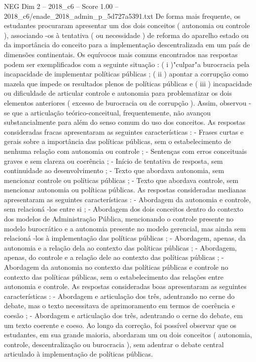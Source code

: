 \begin{textsample}{NEG Dim 2 – 2018\_c6 – Score 1.00 – 2018\_c6/enade\_2018\_admin\_p\_5d727a5391.txt}
De forma mais frequente, os estudantes procuraram apresentar um dos dois conceitos ( autonomia ou controle ), associando -os à tentativa ( ou necessidade ) de reforma do aparelho estado ou da importância do conceito para a implementação descentralizada em um país de dimensões continentais.
Os equívocos mais comuns encontrados nas respostas podem ser exemplificados com a seguinte situação : ( i )"culpar"a burocracia pela incapacidade de implementar políticas públicas ; ( ii ) apontar a corrupção como mazela que impede os resultados plenos de políticas públicas e ( iii ) incapacidade ou dificuldade de articular controle e autonomia para problematizar os dois elementos anteriores ( excesso de burocracia ou de corrupção ).
Assim, observou -se que a articulação teórico-conceitual, frequentemente, não avançou substancialmente para além do senso comum do uso dos conceitos.
As respostas consideradas fracas apresentaram as seguintes características : - Frases curtas e gerais sobre a importância das políticas públicas, sem o estabelecimento de nenhuma relação com autonomia ou controle ; - Sentenças com erros conceituais graves e sem clareza ou coerência ; - Início de tentativa de resposta, sem continuidade ao desenvolvimento ; - Texto que abordava autonomia, sem mencionar controle ou políticas públicas ; - Texto que abordava controle, sem mencionar autonomia ou políticas públicas.
As respostas consideradas medianas apresentaram as seguintes características : - Abordagem da autonomia e controle, sem relacioná -los entre si ; - Abordagem dos dois conceitos dentro do contexto dos modelos de Administração Pública, mencionando o controle presente no modelo burocrático e a autonomia presente no modelo gerencial, mas ainda sem relacioná -los à implementação das políticas públicas ; - Abordagem, apenas, da autonomia e a relação dela ao contexto das políticas públicas ; - Abordagem, apenas, do controle e a relação dele ao contexto das políticas públicas ; - Abordagem da autonomia no contexto das políticas públicas e controle no contexto das políticas públicas, sem o estabelecimento das relações entre autonomia e controle.
As respostas consideradas boas apresentaram as seguintes características : - Abordagem e articulação dos três, adentrando no cerne do debate, mas o texto necessitava de aprimoramento em termos de coerência e coesão ; - Abordagem e articulação dos três, adentrando o cerne do debate, em um texto coerente e coeso.
Ao longo da correção, foi possível observar que os estudantes, em sua grande maioria, abordaram um ou dois conceitos ( autonomia, controle, descentralização ou burocracia ), sem adentrar o debate central articulado à implementação de políticas públicas.

\end{textsample}
